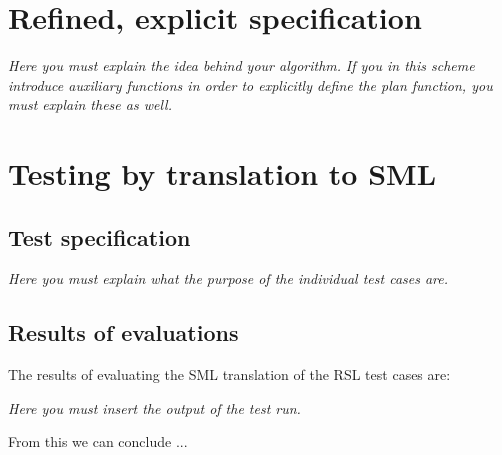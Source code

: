\documentclass[a4]{article}
\begin{document}
\section{Refined, explicit specification}

  

{\em Here you must explain the idea behind your algorithm.}
{\em If you in this scheme introduce auxiliary functions in order to explicitly
  define the plan function, you must explain these as well.}

\section{Testing by translation to SML}

\subsection{Test specification}


        
{\em Here you must  explain what the purpose of the individual test
  cases are.}


\subsection{Results of evaluations}


The results of evaluating the SML translation of the RSL test cases are:

{\em Here you must  insert the output of the test run.}



\noindent From this we can conclude ...
\end{document}
